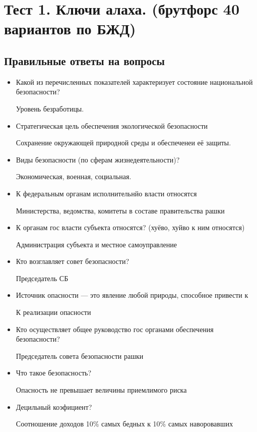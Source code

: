 \documentclass[oneside,final,14pt]{extreport}
\begin{document}
\section*{Тест 1. Ключи алаха. (брутфорс 40 вариантов по БЖД)}
\subsection*{Правильные ответы на вопросы}
\begin{itemize}
	\item Какой из перечисленных показателей характеризует состояние национальной безопасности?
	
	Уровень безработицы.
	
	\item Стратегическая цель обеспечения экологической безопасности
	
	Сохранение окружающей природной среды и обеспеченеи её защиты.
	
	\item Виды безопасности (по сферам жизнедеятельности)?
	
	Экономическая, военная, социальная.
	
	\item К федеральным органам исполнительнйо власти относятся
	
	Министерства, ведомства, комитеты в составе правительства рашки
	
	\item К органам гос власти субъекта относятся? (хуёво, хуйво к ним относятся)
	
	Администрация субъекта и местное самоуправление
	
	\item Кто возглавляет совет безопасности?
	
	Председатель СБ
	
	\item Источник опасности --- это явление любой природы, способное привести к
	
	К реализации опасности
	
	\item Кто осуществляет общее руководство гос органами обеспечения безопасности?
	
	Председатель совета безопасности рашки
	
	\item Что такое безопасность?
	
	Опасность не превышает величины приемлимого риска
	
	\item Децильный коэфициент?
	
	Соотношение доходов 10\% самых бедных к 10\% самых наворовавших
	 
	
	
\end{itemize}
\end{document}
